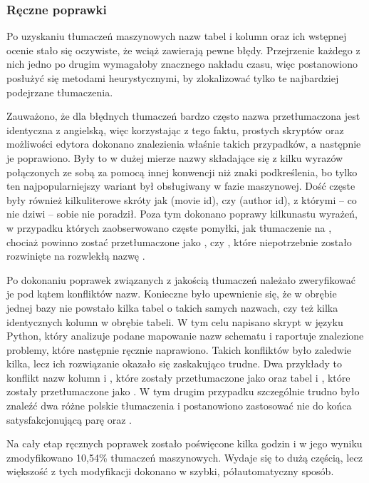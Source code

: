 \subsubsection{Ręczne poprawki}
Po uzyskaniu tłumaczeń maszynowych nazw tabel i kolumn oraz ich wstępnej ocenie stało się oczywiste, że wciąż zawierają pewne błędy. Przejrzenie każdego z nich jedno po drugim wymagałoby znacznego nakładu czasu, więc postanowiono posłużyć się metodami heurystycznymi, by zlokalizować tylko te najbardziej podejrzane tłumaczenia. 

Zauważono, że dla błędnych tłumaczeń bardzo często nazwa przetłumaczona jest identyczna z angielską, więc korzystając z tego faktu, prostych skryptów oraz możliwości edytora  dokonano znalezienia właśnie takich przypadków, a następnie je poprawiono. Były to w dużej mierze nazwy składające się z kilku wyrazów połączonych ze sobą za pomocą innej konwencji niż znaki podkreślenia, bo tylko ten najpopularniejszy wariant był obsługiwany w fazie maszynowej. Dość częste były również kilkuliterowe skróty jak  (movie id), czy  (author id), z którymi -- co nie dziwi --  sobie nie poradził. Poza tym dokonano poprawy kilkunastu wyrażeń, w przypadku których zaobserwowano częste pomyłki, jak tłumaczenie  na , chociaż powinno zostać przetłumaczone jako , czy , które niepotrzebnie zostało rozwinięte na rozwlekłą nazwę .

Po dokonaniu poprawek związanych z jakością tłumaczeń należało zweryfikować je pod kątem konfliktów nazw. Konieczne było upewnienie się, że w obrębie jednej bazy nie powstało kilka tabel o takich samych nazwach, czy też kilka identycznych kolumn w obrębie tabeli. W tym celu napisano skrypt w języku Python, który analizuje podane mapowanie nazw schematu i raportuje znalezione problemy, które następnie ręcznie naprawiono. Takich konfliktów było zaledwie kilka, lecz ich rozwiązanie okazało się zaskakująco trudne. Dwa przykłady to konflikt nazw kolumn  i , które zostały przetłumaczone jako  oraz tabel  i \mbox{}, które zostały przetłumaczone jako \mbox{}. W tym drugim przypadku szczególnie trudno było znaleźć dwa różne polskie tłumaczenia i postanowiono zastosować nie do końca satysfakcjonującą parę  oraz .

Na cały etap ręcznych poprawek zostało poświęcone kilka godzin i w jego wyniku zmodyfikowano 10,54\% tłumaczeń maszynowych. Wydaje się to dużą częścią, lecz większość z tych modyfikacji dokonano w szybki, półautomatyczny sposób.


